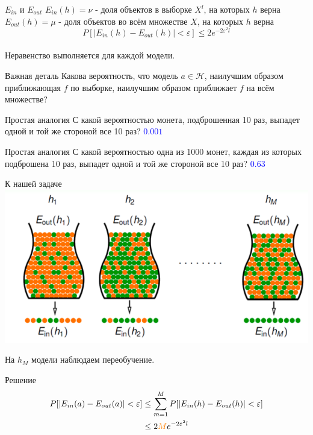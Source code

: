 \documentclass[10pt]{beamer}
\begin{document}
\begin{frame}{$E_{in}$ и $E_{out}$}
  $E_{in}(h) = \nu$ - доля объектов в выборке $X^l$, на которых $h$ верна\\
  $E_{out}(h) = \mu$ - доля объектов во всём множестве $X$, на которых $h$ верна\\
  \bigbreak
  $$P[\vert E_{in}(h) - E_{out}(h) \vert < \varepsilon ] \leq 2 e^{-2 \varepsilon^2 l} $$\\
  \bigbreak
  Неравенство выполняется для каждой модели.
\end{frame}

\begin{frame}{Важная деталь}
  \centering
  Какова вероятность, что модель $a \in \mathcal{H}$, наилучшим образом приближающая $f$ по выборке, наилучшим образом приближает $f$ на всём множестве?
\end{frame}

\begin{frame}{Простая аналогия}
  \centering
  С какой вероятностью монета, подброшенная 10 раз, выпадет одной и той же стороной все 10 раз?
  \pause
  \bigbreak
  \textcolor{blue}{$0.001$}
\end{frame}

\begin{frame}{Простая аналогия}
  \centering
  С какой вероятностью одна из 1000 монет, каждая из которых подброшена 10 раз, выпадет одной и той же стороной все 10 раз?
  \pause
  \bigbreak
  \textcolor{blue}{$0.63$}
\end{frame}

\begin{frame} {К нашей задаче}
  \includegraphics[width=\textwidth, keepaspectratio]{images/bins}
  
  На $h_M$ модели наблюдаем переобучение.
\end{frame}

\begin{frame} {Решение}
  \begin{align*}
    P[\vert E_{in}(a) - E_{out}(a) \vert < \varepsilon ] &\leq \sum\limits_{m=1}^M P[\vert E_{in}(h) - E_{out}(h) \vert < \varepsilon ] \\
    & \leq 2\textcolor{orange}{M} e^{-2 \varepsilon^2 l} 
  \end{align*}
\end{frame}
\end{document}
